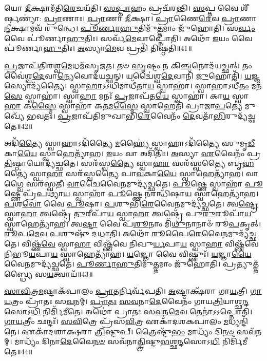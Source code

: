 𑌯𑍋 \ul{𑌦𑍀}\-𑌕𑍍𑌷𑌾𑌮᳴𑌤𑌿\-\ul{𑌰𑍇}\-𑌚𑌯᳴𑌤𑌿।
\-\ul{𑌸}\-\-\ul{𑌪𑍍𑌤𑌾}\-𑌹𑌂 𑌪𑍍𑌰𑌚᳴𑌰𑌨𑍍𑌤𑌿।
\-\ul{𑌸}\-𑌪𑍍𑌤 𑌵𑍈 𑌶𑍀᳴𑌰𑍍\mbox{}\-\ul{𑌷}\-𑌣𑍍𑌯𑌾॑: \ul{𑌪𑍍𑌰𑌾}\-𑌣𑌾𑌃।
\-\ul{𑌪𑍍𑌰𑌾}\-𑌣𑌾 \ul{𑌦𑍀}\-𑌕𑍍𑌷𑌾।
\-\ul{𑌪𑍍𑌰𑌾}\-𑌣𑍈\-\ul{𑌰𑍇}\-𑌵 \ul{𑌪𑍍𑌰𑌾}\-𑌣𑌾\-\ul{𑌨𑍍𑌦𑍀}\-𑌕𑍍𑌷𑌾𑌮𑌵᳴ 𑌰𑍁𑌨𑍍𑌧𑍇।
\-\ul{𑌪𑍂}\-\-\ul{𑌰𑍍𑌣𑌾}\-\-\ul{𑌹𑍁}\-𑌤𑌿𑌮𑍁᳴\-\ul{𑌤𑍍𑌤}\-𑌮𑌾𑌂 𑌜𑍁᳴𑌹𑍋𑌤𑌿।
𑌸\-\ul{𑌰𑍍𑌵𑌂} 𑌵𑍈 𑌪𑍂॑𑌰𑍍𑌣𑌾\-\ul{𑌹𑍁}\-𑌤𑌿𑌃।
𑌸𑌰𑍍𑌵᳴\-\-\ul{𑌮𑍇}\-𑌵𑌾\-𑌪𑍍𑌨𑍋᳴𑌤𑌿।
𑌅𑌥𑍋᳴ \ul{𑌇}\-𑌯𑌂 𑌵𑍈 𑌪𑍂॑𑌰𑍍𑌣𑌾\-\ul{𑌹𑍁}\-𑌤𑌿𑌃।
\-\ul{𑌅}\-𑌸𑍍𑌯𑌾\-\ul{𑌮𑍇}\-𑌵 𑌪𑍍𑌰𑌤𑌿᳴ 𑌤𑌿𑌷𑍍𑌠𑌤𑌿॥41॥\anuvakamend[\-\ul{𑌰𑍁}\-\-\ul{𑌨𑍍𑌧𑍇} \ul{𑌪𑍍𑌰𑌾}\-𑌣𑌾\-\ul{𑌨𑍍𑌦𑍀}\-𑌕𑍍𑌷𑌾𑌮𑌵᳴ 𑌰𑍁𑌨𑍍𑌧 𑌉𑌚𑍍𑌯𑌤𑍇 𑌕𑍍𑌰𑌾𑌮𑌨𑍍𑌤𑌿 𑌤𑌿𑌷𑍍𑌠𑌤𑌿]

\-\ul{𑌪𑍍𑌰}\-𑌜𑌾𑌪᳴𑌤𑌿𑌰𑌶𑍍𑌵\-\ul{𑌮𑍇}\-𑌧𑌮᳴\-𑌸𑍃𑌜𑌤।
𑌤𑍞 \ul{𑌸𑍃}\-𑌷𑍍𑌟𑌂 𑌨 𑌕𑌿\-\ul{𑌞𑍍𑌚}\-𑌨𑍋𑌦᳴𑌯𑌚𑍍𑌛𑌤𑍍।
𑌤𑌂 𑌵𑍈॑𑌶𑍍𑌵\-\ul{𑌦𑍇}\-𑌵𑌾\-\ul{𑌨𑍍𑌯𑍇}\-𑌵𑍋𑌦᳴𑌯𑌚𑍍𑌛𑌨𑍍।
𑌯𑌦𑍍𑌵𑍈॑𑌶𑍍𑌵\-\ul{𑌦𑍇}\-𑌵𑌾𑌨𑌿᳴ \ul{𑌜𑍁}\-𑌹𑍋𑌤𑌿᳴।
\-\ul{𑌯}\-𑌜𑍍𑌞𑌸𑍍𑌯𑍋𑌦𑍍𑌯᳴𑌤𑍍𑌯𑍈।
𑌸𑍍𑌵𑌾\-\ul{𑌹𑌾}\-\-𑌽𑌽𑌧𑌿𑌮𑌾𑌧𑍀᳴𑌤𑌾\-\ul{𑌯} 𑌸𑍍𑌵𑌾𑌹𑌾॑।
𑌸𑍍𑌵𑌾𑌹𑌾\-𑌽𑌧𑍀᳴\-\ul{𑌤𑌂} 𑌮𑌨᳴\-\ul{𑌸𑍇} 𑌸𑍍𑌵𑌾𑌹𑌾॑।
𑌸𑍍𑌵𑌾\-\ul{𑌹𑌾} 𑌮𑌨𑌃᳴ \ul{𑌪𑍍𑌰}\-𑌜𑌾𑌪᳴𑌤\-\ul{𑌯𑍇} 𑌸𑍍𑌵𑌾𑌹𑌾॑।
𑌕𑌾\-\ul{𑌯} 𑌸𑍍𑌵𑌾\-\ul{𑌹𑌾} 𑌕\-\ul{𑌸𑍍𑌮𑍈} 𑌸𑍍𑌵𑌾𑌹𑌾᳴ 𑌕\-\ul{𑌤}\-𑌮\-\ul{𑌸𑍍𑌮𑍈} 𑌸𑍍𑌵𑌾𑌹𑍇𑌤𑌿᳴ 𑌪𑍍𑌰𑌾𑌜𑌾\-\ul{𑌪}\-𑌤𑍍𑌯𑍇 𑌮𑍁𑌖𑍍𑌯𑍇᳴ 𑌭𑌵𑌤𑌃।
\-\ul{𑌪𑍍𑌰}\-𑌜𑌾𑌪᳴𑌤𑌿𑌮𑍁𑌖𑌾𑌭𑌿\-\ul{𑌰𑍇}\-𑌵𑍈𑌨𑌂᳴ \ul{𑌦𑍇}\-𑌵𑌤𑌾᳴\-\ul{𑌭𑌿}\-𑌰𑍁𑌦𑍍𑌯᳴𑌚𑍍𑌛𑌤𑍇॥42॥

𑌅𑌦𑌿᳴\-\ul{𑌤𑍍𑌯𑍈} 𑌸𑍍𑌵𑌾𑌹𑌾\-𑌽𑌦𑌿᳴𑌤𑍍𑌯𑍈 \ul{𑌮}\-𑌹𑍍𑌯𑍈॑ 𑌸𑍍𑌵𑌾𑌹𑌾\-𑌽𑌦𑌿᳴𑌤𑍍𑌯𑍈 𑌸𑍁𑌮𑍃\-\ul{𑌡𑍀}\-𑌕𑌾\-\ul{𑌯𑍈} 𑌸𑍍𑌵𑌾𑌹𑍇𑌤𑍍𑌯𑌾᳴𑌹।
\-\ul{𑌇}\-𑌯𑌂 𑌵𑌾 𑌅𑌦𑌿᳴𑌤𑌿𑌃।
\-\ul{𑌅}\-𑌸𑍍𑌯𑌾 \ul{𑌏}\-𑌵𑍈𑌨𑌂᳴ 𑌪𑍍𑌰\-\ul{𑌤𑌿}\-𑌷𑍍𑌠𑌾𑌯𑍋𑌦𑍍𑌯᳴𑌚𑍍𑌛𑌤𑍇।
𑌸𑌰᳴𑌸𑍍𑌵\-\ul{𑌤𑍍𑌯𑍈} 𑌸𑍍𑌵𑌾\-\ul{𑌹𑌾} 𑌸𑌰᳴𑌸𑍍𑌵𑌤𑍍𑌯𑍈 𑌬𑍃\-\ul{𑌹}\-𑌤𑍍𑌯𑍈॑ 𑌸𑍍𑌵𑌾\-\ul{𑌹𑌾} 𑌸𑌰᳴𑌸𑍍𑌵𑌤𑍍𑌯𑍈 𑌪𑌾\-\ul{𑌵}\-𑌕𑌾\-\ul{𑌯𑍈} 𑌸𑍍𑌵𑌾𑌹𑍇𑌤𑍍𑌯𑌾᳴𑌹।
𑌵𑌾𑌗𑍍𑌵𑍈 𑌸𑌰᳴𑌸𑍍𑌵𑌤𑍀।
\-\ul{𑌵𑌾}\-𑌚𑍈𑌵𑍈\-\ul{𑌨}\-𑌮𑍁𑌦𑍍𑌯᳴𑌚𑍍𑌛𑌤𑍇।
\-\ul{𑌪𑍂}\-𑌷𑍍𑌣𑍇 𑌸𑍍𑌵𑌾𑌹𑌾᳴ \ul{𑌪𑍂}\-𑌷𑍍𑌣𑍇 𑌪𑍍𑌰᳴\-\ul{𑌪}\-𑌥𑍍𑌯𑌾᳴\-\ul{𑌯} 𑌸𑍍𑌵𑌾𑌹𑌾᳴ \ul{𑌪𑍂}\-𑌷𑍍𑌣𑍇 \ul{𑌨}\-𑌰𑌨𑍍𑌧𑌿᳴𑌷𑌾\-\ul{𑌯} 𑌸𑍍𑌵𑌾𑌹𑍇𑌤𑍍𑌯𑌾᳴𑌹।
\-\ul{𑌪}\-𑌶\-\ul{𑌵𑍋} 𑌵𑍈 \ul{𑌪𑍂}\-𑌷𑌾।
\-\ul{𑌪}\-𑌶𑍁𑌭𑌿᳴\-\ul{𑌰𑍇}\-𑌵𑍈\-\ul{𑌨}\-𑌮𑍁𑌦𑍍𑌯᳴𑌚𑍍𑌛𑌤𑍇।
𑌤𑍍𑌵\-\ul{𑌷𑍍𑌟𑍍𑌰𑍇} 𑌸𑍍𑌵𑌾\-\ul{𑌹𑌾} 𑌤𑍍𑌵𑌷𑍍𑌟𑍍𑌰𑍇᳴ \ul{𑌤𑍁}\-𑌰𑍀𑌪𑌾᳴\-\ul{𑌯} 𑌸𑍍𑌵𑌾\-\ul{𑌹𑌾} 𑌤𑍍𑌵𑌷𑍍𑌟𑍍𑌰𑍇᳴ 𑌪𑍁\-\ul{𑌰𑍁}\-𑌰𑍂𑌪𑌾᳴\-\ul{𑌯} 𑌸𑍍𑌵𑌾𑌹𑍇𑌤𑍍𑌯𑌾᳴𑌹।
𑌤𑍍𑌵\-\ul{𑌷𑍍𑌟𑌾} 𑌵𑍈 𑌪᳴\-\ul{𑌶𑍂}\-𑌨𑌾𑌂 𑌮𑌿᳴\-\ul{𑌥𑍁}\-𑌨𑌾𑌨𑌾𑍞᳴ 𑌰𑍂\-\ul{𑌪}\-𑌕𑍃𑌤𑍍।
\-\ul{𑌰𑍂}\-𑌪\-\ul{𑌮𑍇}\-𑌵 \ul{𑌪}\-𑌶𑍁𑌷𑍁᳴ 𑌦𑌧𑌾𑌤𑌿।
𑌅𑌥𑍋᳴ \ul{𑌰𑍂}\-𑌪𑍈\-\ul{𑌰𑍇}\-𑌵𑍈\-\ul{𑌨}\-𑌮𑍁𑌦𑍍𑌯᳴𑌚𑍍𑌛𑌤𑍇।
𑌵𑌿𑌷𑍍𑌣᳴\-\ul{𑌵𑍇} 𑌸𑍍𑌵𑌾\-\ul{𑌹𑌾} 𑌵𑌿𑌷𑍍𑌣᳴𑌵𑍇 𑌨𑌿𑌖𑍁\-\ul{𑌰𑍍𑌯}\-𑌪𑌾\-\ul{𑌯} 𑌸𑍍𑌵𑌾\-\ul{𑌹𑌾} 𑌵𑌿𑌷𑍍𑌣᳴𑌵𑍇 𑌨𑌿𑌭𑍂\-\ul{𑌯}\-𑌪𑌾\-\ul{𑌯} 𑌸𑍍𑌵𑌾𑌹𑍇𑌤𑍍𑌯𑌾᳴𑌹।
\-\ul{𑌯}\-𑌜𑍍𑌞𑍋 𑌵𑍈 𑌵𑌿𑌷𑍍𑌣𑍁𑌃᳴।
\-\ul{𑌯}\-𑌜𑍍𑌞𑌾\-\ul{𑌯𑍈}\-𑌵𑍈\-\ul{𑌨}\-𑌮𑍁𑌦𑍍𑌯᳴𑌚𑍍𑌛𑌤𑍇।
\-\ul{𑌪𑍂}\-\-\ul{𑌰𑍍𑌣𑌾}\-\-\ul{𑌹𑍁}\-𑌤𑌿𑌮𑍁᳴\-\ul{𑌤𑍍𑌤}\-𑌮𑌾𑌂 𑌜𑍁᳴𑌹𑍋𑌤𑌿।
𑌪𑍍𑌰𑌤𑍍𑌯𑍁𑌤𑍍𑌤᳴𑌬𑍍𑌧𑍍𑌯𑍈 𑌸\-\ul{𑌯}\-𑌤𑍍𑌵𑌾𑌯᳴॥43॥\anuvakamend[\-\ul{𑌯}\-\-\ul{𑌚𑍍𑌛}\-\-\ul{𑌤𑍇} \ul{𑌪𑍁}\-\-\ul{𑌰𑍁}\-𑌰𑍂𑌪𑌾᳴\-\ul{𑌯} 𑌸𑍍𑌵𑌾𑌹𑍇𑌤𑍍𑌯𑌾᳴\-\ul{𑌹𑌾}\-𑌷𑍍𑌟𑍗 𑌚᳴]

\-\ul{𑌸𑌾}\-\-\ul{𑌵𑌿}\-𑌤𑍍𑌰\-\ul{𑌮}\-𑌷𑍍𑌟𑌾\-𑌕᳴𑌪𑌾𑌲𑌂 \ul{𑌪𑍍𑌰𑌾}\-𑌤𑌰𑍍𑌨𑌿𑌰𑍍𑌵᳴𑌪𑌤𑌿।
\-\ul{𑌅}\-𑌷𑍍𑌟𑌾𑌕𑍍𑌷᳴𑌰𑌾 𑌗𑌾\-\ul{𑌯}\-𑌤𑍍𑌰𑍀।
\-\ul{𑌗𑌾}\-\-\ul{𑌯}\-𑌤𑍍𑌰𑌂 𑌪𑍍𑌰𑌾᳴𑌤𑌃 𑌸\-\ul{𑌵}\-𑌨𑌮𑍍।
\-\ul{𑌪𑍍𑌰𑌾}\-\-\ul{𑌤𑌃} \ul{𑌸}\-\-\ul{𑌵}\-𑌨𑌾\-\ul{𑌦𑍇}\-𑌵𑍈𑌨𑌂᳴ 𑌗𑌾𑌯\-\ul{𑌤𑍍𑌰𑌿}\-𑌯𑌾𑌶𑍍𑌛\-\ul{𑌨𑍍𑌦}\-𑌸𑍋\-𑌽\-\ul{𑌧𑌿} 𑌨𑌿𑌰𑍍𑌮𑌿᳴𑌮𑍀𑌤𑍇।
𑌅𑌥𑍋॑ 𑌪𑍍𑌰𑌾𑌤𑌃 𑌸\-\ul{𑌵}\-𑌨\-\ul{𑌮𑍇}\-𑌵 𑌤𑍇𑌨𑌾॑𑌽𑌽𑌪𑍍𑌨𑍋𑌤𑌿।
\-\ul{𑌗𑌾}\-\-\ul{𑌯}\-𑌤𑍍𑌰𑍀𑌂 𑌛𑌨𑍍𑌦𑌃᳴।
\-\ul{𑌸}\-\-\ul{𑌵𑌿}\-𑌤𑍍𑌰𑍇 𑌪𑍍𑌰᳴𑌸\-\ul{𑌵𑌿}\-𑌤𑍍𑌰 𑌏𑌕𑌾᳴\-𑌦𑌶\-𑌕𑌪𑌾𑌲𑌂 \ul{𑌮}\-𑌧𑍍𑌯𑌨𑍍𑌦𑌿᳴𑌨𑍇।
𑌏𑌕𑌾᳴𑌦𑌶𑌾𑌕𑍍𑌷𑌰𑌾 \ul{𑌤𑍍𑌰𑌿}\-𑌷𑍍𑌟𑍁𑌪𑍍।
𑌤𑍍𑌰𑍈𑌷𑍍𑌟𑍁᳴\-\ul{𑌭𑌂} 𑌮𑌾𑌧𑍍𑌯𑌂᳴ 𑌦𑌿\-\ul{𑌨}\-\-\ul{𑍞} 𑌸𑌵᳴𑌨𑌮𑍍।
𑌮𑌾𑌧𑍍𑌯𑌂᳴ 𑌦𑌿𑌨𑌾\-\ul{𑌦𑍇}\-𑌵𑍈\-\ul{𑌨}\-\-\ul{𑍞} 𑌸𑌵᳴𑌨𑌾\-\ul{𑌤𑍍𑌤𑍍𑌰𑌿}\-𑌷𑍍𑌟𑍁\-\ul{𑌭}\-𑌶𑍍𑌛\-\ul{𑌨𑍍𑌦}\-𑌸𑍋𑌽\-\ul{𑌧𑌿} 𑌨𑌿𑌰𑍍𑌮𑌿᳴𑌮𑍀𑌤𑍇॥44॥

